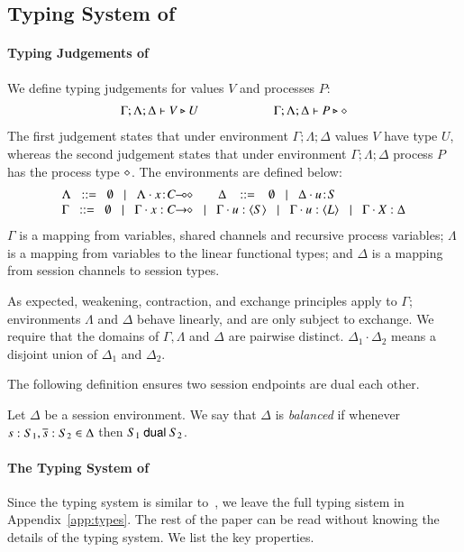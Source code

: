\subsection{Typing System of \HOp}
\label{subsec:typing}
\paragraph{Typing Judgements of \HOp}
\noi We define typing judgements for values $V$
and processes $P$:
%
\[	\begin{array}{c}
		\Gamma; \Lambda; \Delta \vdash V \triangleright U \qquad \qquad \qquad \Gamma; \Lambda; \Delta \vdash P \triangleright \diamond
	\end{array}
\]
The first judgement
states that under environment $\Gamma; \Lambda; \Delta$ values $V$
have type $U$, whereas the second judgement states that under
environment $\Gamma; \Lambda; \Delta$ process $P$ has the process type
$\diamond$. The environments are defined below:
\[
\begin{array}{l}
 \Lambda \bnfis  \emptyset \bnfbar \Lambda \cat \AT{x}{\lhot{C}}
\quad\quad \Delta  \ \bnfis  \ \emptyset \bnfbar \Delta \cat \AT{u}{S} \\
 \Gamma  \bnfis  \emptyset \bnfbar \Gamma \cat \varp{x}: \shot{C} \bnfbar \Gamma \cat u: \chtype{S} \bnfbar \Gamma \cat u: \chtype{L} 
        \bnfbar \Gamma \cat \rvar{X}: \Delta
\end{array}
\]
\noi 
$\Gamma$ is a mapping from variables, shared channels and recursive 
process variables;  $\Lambda$ is a mapping from variables to 
the linear functional types; and $\Delta$ is a mapping from 
session channels to session types. 

As expected, weakening, contraction, and exchange principles apply to
$\Gamma$; environments $\Lambda$ and $\Delta$ behave linearly, and are
only subject to exchange.  We require that the domains of $\Gamma,
\Lambda$ and $\Delta$ are pairwise distinct. $\Delta_1\cdot \Delta_2$ means 
a disjoint union of $\Delta_1$ and $\Delta_2$.  

The following definition ensures two session endpoints 
are dual each other. 

\begin{definition}[Balance]\label{d:wtenv}%
	Let $\Delta$ be a session environment.
	We say that $\Delta$ is {\em balanced} if whenever
	$s: S_1, \overline{s}: S_2 \in \Delta$ then $S_1 \ \mathsf{dual}\  S_2$.
\end{definition}

\paragraph{The Typing System of \HOp}
Since the typing system is similar to~\cite{tlca07}, we leave the full
typing sistem in Appendix~\ref{app:types}.  The rest of the paper can
be read without knowing the details of the typing system. We list the
key properties.



